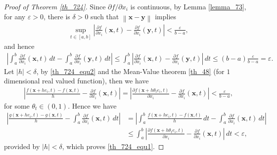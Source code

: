 \documentclass[10pt]{book}
\theoremstyle{definition}
\numberwithin{equation}{chapter}
\begin{document}
\begin{proof}[Proof of Theorem \ref{th_724}]
Since $\partial f/\partial x_i$ is continuous, by Lemma \ref{lemma_73}, for any $\varepsilon > 0$, there is $\delta > 0$ such that $\left\|\mathbf{x} - \mathbf{y}\right\|$ implies
\begin{align}\label{th_724_equ2}
    \sup_{t\in[a,b]} \left|\frac{\partial f}{\partial x_i}(\mathbf{x},t) - \frac{\partial f}{\partial x_i}(\mathbf{y},t)\right| < \frac{\varepsilon}{b - a},
\end{align}
and hence
\begin{align*}
    \left|\int^b_a \frac{\partial f}{\partial x_i}(\mathbf{x},t) \,dt - \int^b_a \frac{\partial f}{\partial x_i}(\mathbf{y},t) \,dt\right| \leq \int^b_a \left|\frac{\partial f}{\partial x_i}(\mathbf{x},t) - \frac{\partial f}{\partial x_i}(\mathbf{y},t)\right| \,dt \leq (b-a) \frac{\varepsilon}{b - a} = \varepsilon.
\end{align*}
Let $\left|h\right| < \delta$, by \eqref{th_724_equ2} and the Mean-Value theorem \ref{th_48} (for $1$ dimensional real valued function), then we have
\begin{align*}
    \left|\frac{f(\mathbf{x} + he_i,t) - f(\mathbf{x},t)}{h} - \frac{\partial f}{\partial x_i}(\mathbf{x},t)\right| = \left|\frac{\partial f(\mathbf{x} + h \theta_t e_i,t)}{\partial x_i} - \frac{\partial f}{\partial x_i}(\mathbf{x},t)\right| < \frac{\varepsilon}{b - a},
\end{align*}
for some $\theta_t \in (0,1)$. Hence we have
\begin{align*}
    \left|\frac{g(\mathbf{x} + he_i,t) - g(\mathbf{x},t)}{h} - \int^b_a \frac{\partial f}{\partial x_i}(\mathbf{x},t) \,dt\right| & = \left|\int^b_a \frac{f(\mathbf{x} + he_i,t) - f(\mathbf{x},t)}{h} \,dt - \int^b_a \frac{\partial f}{\partial x_i}(\mathbf{x},t) \,dt\right| \\
    & \leq \int^b_a \left|\frac{\partial f(\mathbf{x} + h \theta_t e_i,t)}{\partial x_i} - \frac{\partial f}{\partial x_i}(\mathbf{x},t)\right| \,dt < \varepsilon,
\end{align*}
provided by $\left|h\right| < \delta$, which proves \eqref{th_724_equ1}.
\end{proof}






















\newpage


\end{document}
